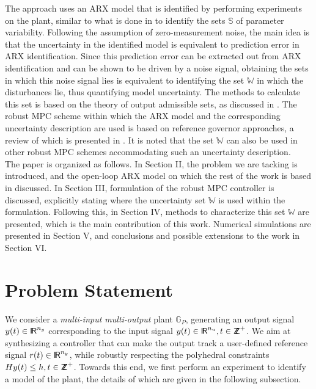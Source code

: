 \documentclass[letterpaper, 10 pt, conference]{ieeeconf}  %
\newcommand*{\RR}{%
	\textsf{I\kern-.3ex R}%
}
\newcommand*{\ZZ}{%
	\textsf{Z\kern-1ex Z}%
}
\begin{document}
 \indent
 The approach uses an ARX model that is identified by performing experiments on the plant, similar to what is done in \cite{7330793} to identify the sets $\mathbb{S}$ of parameter variability. Following the assumption of zero-measurement noise, the main idea is that the uncertainty in the identified model is equivalent to prediction error in ARX identification. Since this prediction error can be extracted out from ARX identification and can be shown to be driven by a noise signal, obtaining the sets in which this noise signal lies is equivalent to identifying the set $\mathbb{W}$ in which the disturbances lie, thus quantifying model uncertainty. The methods to calculate this set is based on the theory of output admissible sets, as discussed in \cite{531239}.
 \noindent
 The robust MPC scheme within which the ARX model and the corresponding uncertainty description are used is based on reference governor approaches, a review of which is presented in \cite{Garone:2017:RCG:3032127.3032157}. It is noted that the set $\mathbb{W}$ can also be used in other robust MPC schemes accommodating such an uncertainty description.
 \\
 \indent
 The paper is organized as follows. In Section II, the problem we are tacking is introduced, and the open-loop ARX model on which the rest of the work is based in discussed. In Section III, formulation of the robust MPC controller is discussed, explicitly stating where the uncertainty set $\mathbb{W}$ is used within the formulation. Following this, in Section IV, methods to characterize this set $\mathbb{W}$ are presented, which is the main contribution of this work. Numerical simulations are presented in Section V, and conclusions and possible extensions to the work in Section VI.
 
\section{Problem Statement}
We consider a \textit{multi-input multi-output} plant $\mathbb{G}_P$, generating an output signal $y(t) \in  \RR^{n_y}$ corresponding to the input signal $y(t) \in\RR^{n_u}, t \in \ZZ^+$. We aim at synthesizing a controller that can make the output track a user-defined reference signal $r(t) \in  \RR^{n_y}$, while robustly respecting the polyhedral constraints $Hy(t) \leq h , t \in \ZZ^+$. Towards this end, we first perform an experiment to identify a model of the plant, the details of which are given in the following subsection. 
\end{document}

